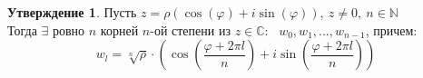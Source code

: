 \documentclass[a4paper, 12pt]{article}
\newcommand{\N}{\mathbb N}
\renewcommand{\phi}{\varphi}
\theoremstyle{definition}
\newtheorem*{subtheorem}{Утверждение}
\begin{document}
  \begin{subtheorem}
    Пусть $z = \rho(\cos(\phi) + i\sin(\phi)), \ z \neq 0, \ n\in \N$\\
    Тогда $\exists$ ровно $n$ корней $n$-ой степени из $z\in \mathbb{C}$: \ $w_0, w_1,...,w_{n-1}$, причем: 
    $$w_l = \sqrt[n]{\rho}\cdot (\cos(\frac{\phi+2\pi l}{n})+i\sin(\frac{\phi+2\pi l}{n}))$$






\end{subtheorem}
\end{document}
